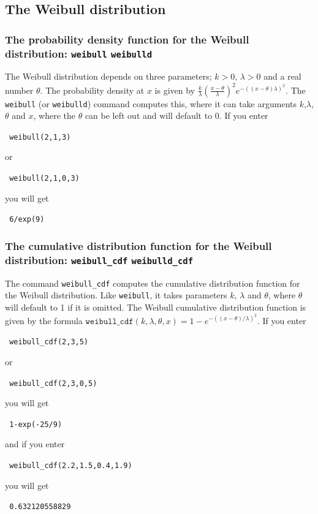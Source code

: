 \documentclass[a4paper,11pt]{book}
\begin{document}
\subsection{The Weibull distribution}
\subsubsection{The probability density function for the Weibull
distribution: \texttt{weibull}
\texttt{weibulld}}

The Weibull distribution depends on three parameters; $k>0$, $\lambda
> 0$ and a real number $\theta$.  The probability density at $x$ is
given by $\frac{k}{\lambda}(\frac{x - \theta}{\lambda})^2
e^{-((x-\theta)\lambda)^2}$.  The \texttt{weibull} (or
\texttt{weibulld}) command computes this, where it can take arguments
$k$,$\lambda$,$\theta$ and $x$, where the $\theta$ can be left out and
will default to 0. If you enter
\begin{center}
  \tt
  weibull(2,1,3)
\end{center}
or
\begin{center}
  \tt
  weibull(2,1,0,3)
\end{center}
you will get
\begin{center}
  \tt
  6/exp(9)
\end{center}

\subsubsection{The cumulative distribution function for the Weibull distribution: \texttt{weibull\_cdf} \texttt{weibulld\_cdf}}

The command \texttt{weibull\_cdf} computes
the cumulative distribution function for the Weibull distribution.
Like \texttt{weibull}, it takes parameters $k$, $\lambda$ and
$\theta$, where $\theta$ will default to 1 if it is omitted.
The Weibull cumulative distribution
function is given by the formula
$\texttt{weibull\_cdf}(k,\lambda,\theta,x) = 1 -
e^{-((x-\theta)/\lambda)^2}$.
If you enter
\begin{center}
  \tt
  weibull\_cdf(2,3,5)
\end{center}
or
\begin{center}
  \tt
  weibull\_cdf(2,3,0,5)
\end{center}
you will get
\begin{center}
  \tt
  1-exp(-25/9)
\end{center}
and if you enter
\begin{center}
  \tt
  weibull\_cdf(2.2,1.5,0.4,1.9)
\end{center}
you will get
\begin{center}
  \tt
  0.632120558829
\end{center}
\end{document}
